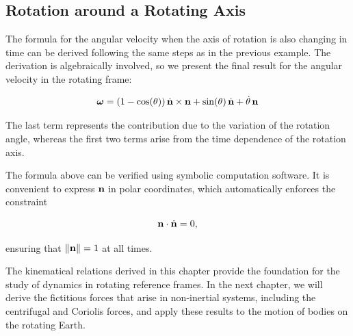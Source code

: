 \documentclass[12pt]{article}
\begin{document}
\subsection{Rotation around a Rotating Axis}

The formula for the angular velocity when the axis of rotation is also changing in time can be
derived following the same steps as in the previous example. The derivation is algebraically involved,
so we present the final result for the angular velocity in the rotating frame:

\begin{equation}
  \boldsymbol{\omega} = (1-\cos(\theta))\,\dot{\vb{n}}\times\vb{n}
    + \sin(\theta)\,\dot{\vb{n}} + \dot\theta\,\vb{n}
  \label{kinematics:moving-axis-angular-velocity}
\end{equation}

The last term represents the contribution due to the variation of the rotation
angle, whereas the first two terms arise from the time dependence of the
rotation axis. \par

The formula above can be verified using symbolic computation software. It is convenient to express
$\vb n$ in polar coordinates, which automatically
enforces the constraint

\[
  \vb n\cdot\dot{\vb n}=0,
\]

ensuring that $\|\vb n\|=1$ at all times. \par

The kinematical relations derived in this chapter provide the foundation for the study of
dynamics in rotating reference frames. In the next chapter, we will derive the fictitious forces that arise in non-inertial
systems, including the centrifugal and Coriolis forces, and apply these results to the motion of bodies on the rotating Earth.

\end{document}
